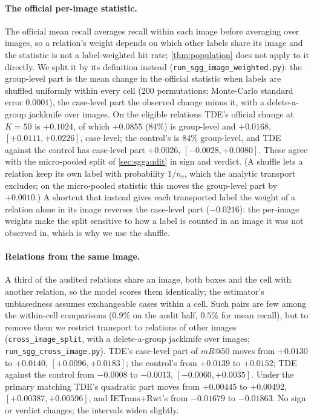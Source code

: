 \paragraph{The official per-image statistic.} The official mean recall averages recall within each
image before averaging over images, so a relation's weight depends on which other labels share
its image and the statistic is not a label-weighted hit rate; \cref{thm:population} does not
apply to it directly. We split it by its definition instead (\texttt{run\_sgg\_image\_weighted.py}):
the group-level part is the mean change in the official statistic when labels are shuffled
uniformly within every cell (200 permutations; Monte-Carlo standard error $0.0001$), the
case-level part the observed change minus it, with a delete-a-group jackknife over images. On
the eligible relations TDE's official change at $K=50$ is $+0.1024$, of which $+0.0855$
($84\%$) is group-level and $+0.0168$, $[+0.0111,+0.0226]$, case-level; the control's is $84\%$
group-level, and TDE against the control has case-level part $+0.0026$, $[-0.0028,+0.0080]$.
These agree with the micro-pooled split of \cref{sec:sggaudit} in sign and verdict. (A shuffle
lets a relation keep its own label with probability $1/n_c$, which the analytic transport
excludes; on the micro-pooled statistic this moves the group-level part by $+0.0010$.) A
shortcut that instead gives each transported label the weight of a relation alone in its image
reverses the case-level part ($-0.0216$): the per-image weights make the split sensitive to how
a label is counted in an image it was not observed in, which is why we use the shuffle.

\paragraph{Relations from the same image.} A third of the audited relations share an image, both
boxes and the cell with another relation, so the model scores them identically; the
estimator's unbiasedness assumes exchangeable cases within a cell. Such pairs are few among
the within-cell comparisons ($0.9\%$ on the audit half, $0.5\%$ for mean recall), but to remove
them we restrict transport to relations of other images
(\texttt{cross\_image\_split}, with a delete-a-group jackknife over images;
\texttt{run\_sgg\_cross\_image.py}). TDE's case-level part of $mR@50$ moves from $+0.0130$ to
$+0.0140$, $[+0.0096,+0.0183]$; the control's from $+0.0139$ to $+0.0152$; TDE against the control
from $-0.0008$ to $-0.0013$, $[-0.0060,+0.0035]$. Under the primary matching TDE's quadratic part
moves from $+0.00445$ to $+0.00492$, $[+0.00387,+0.00596]$, and IETrans+Rwt's from $-0.01679$ to
$-0.01863$. No sign or verdict changes; the intervals widen slightly.

